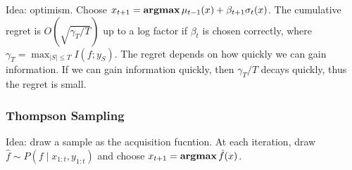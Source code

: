 Idea: optimism. Choose $x_{t+1} = \operatorname{\textbf{argmax}} \mu_{t-1}(x)+\beta_{t+1} \sigma_{t}(x)$. The cumulative regret is $O\left(\sqrt{\gamma_T / T}\right)$ up to a log factor if $\beta_t$ is chosen correctly, where $\gamma_T=\max_{|S|\le T} I(f;y_S)$. The regret depends on how quickly we can gain information. If we can gain information quickly, then $\gamma_T / T$ decays quickly, thus the regret is small.


\subsubsection*{Thompson Sampling}

Idea: draw a sample as the acquisition fucntion. At each iteration, draw $\hat{f}\sim P(f\mid x_{1:t}, y_{1:t})$ and choose $x_{t+1}=\operatorname{\textbf{argmax}} \hat{f}(x)$.